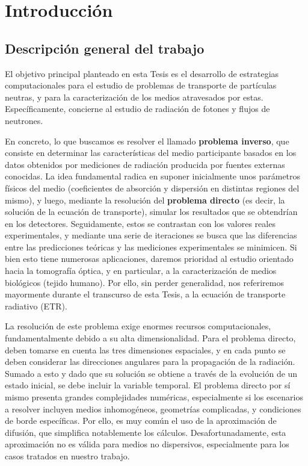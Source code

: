 
\pagestyle{fancy}
\lhead{\thepage}

%


\chapter{Introducción}
\vspace{0.01\textheight}
\pagebreak


\section{Descripción general del trabajo}  

El objetivo principal planteado en esta Tesis es el desarrollo 
de estrategias computacionales para el 
estudio de problemas de transporte de partículas neutras, y para la 
caracterización de los medios atravesados por estas.
Específicamente, concierne al estudio de radiación de fotones y 
flujos de neutrones.

En concreto, lo que buscamos es resolver el llamado  
{\bf problema inverso}, que consiste en determinar las características 
del medio participante basados en los datos obtenidos por mediciones 
de radiación producida por fuentes externas conocidas.
La idea fundamental radica en suponer inicialmente unos parámetros 
físicos del medio (coeficientes de absorción y dispersión en distintas 
regiones del mismo), y luego, mediante la resolución del {\bf problema 
directo} (es decir, la solución de la ecuación de transporte), 
simular los resultados que se obtendrían en los detectores. 
Seguidamente, estos se contrastan con los valores reales experimentales, 
y mediante una serie de iteraciones se busca que las diferencias 
entre las predicciones teóricas y las mediciones experimentales 
se minimicen.
Si bien esto tiene numerosas aplicaciones, daremos prioridad al estudio 
orientado hacia la tomografía óptica, y en particular, a la 
caracterización de medios biológicos (tejido humano). 
Por ello, sin perder generalidad, nos referiremos mayormente 
durante el transcurso de esta Tesis, a la ecuación de transporte radiativo (ETR).

La resolución de este problema exige enormes recursos computacionales, 
fundamentalmente debido a su alta dimensionalidad.
Para el problema directo, deben tomarse en cuenta las tres dimensiones 
espaciales, y en cada punto se deben considerar las direcciones 
angulares para la propagación de la radiación. 
Sumado a esto y dado que su solución se obtiene a través de la 
evolución de un estado inicial, se debe incluir la variable temporal.
El problema directo por sí mismo presenta grandes complejidades 
numéricas, especialmente si los escenarios a resolver incluyen 
medios inhomogéneos, geometrías complicadas, y condiciones de 
borde específicas.
Por ello, es muy común el uso de la aproximación de difusión, 
que simplifica notablemente los cálculos. 
Desafortunadamente, esta aproximación no es válida para medios 
no dispersivos, especialmente para los casos tratados en nuestro trabajo.

